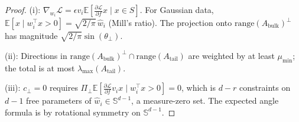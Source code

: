 \documentclass{article}
\providecommand{\E}{\mathbb{E}}
\theoremstyle{plain}
\theoremstyle{definition}
\theoremstyle{remark}
\begin{document}
\begin{proof}
(i): $\nabla_{w_i}\mathcal{L} = \epsilon v_i \E[\frac{\partial\mathcal{L}}{\partial f} x \mid x \in S]$. For Gaussian data, $\E[x \mid w_i^\top x > 0] = \sqrt{2/\pi}\,\hat{w}_i$ (Mill's ratio). The projection onto $\mathrm{range}(A_{\mathrm{bulk}})^\perp$ has magnitude $\sqrt{2/\pi}\sin(\theta_\perp)$.

(ii): Directions in $\mathrm{range}(A_{\mathrm{bulk}})^\perp \cap \mathrm{range}(A_{\mathrm{tail}})$ are weighted by at least $\mu_{\min}$; the total is at most $\lambda_{\max}(A_{\mathrm{tail}})$.

(iii): $c_\perp = 0$ requires $\Pi_\perp \E[\frac{\partial\mathcal{L}}{\partial f} v_i x \mid w_i^\top x > 0] = 0$, which is $d-r$ constraints on $d-1$ free parameters of $\hat{w}_i \in \mathbb{S}^{d-1}$, a measure-zero set. The expected angle formula is by rotational symmetry on $\mathbb{S}^{d-1}$.
\end{proof}
\end{document}
